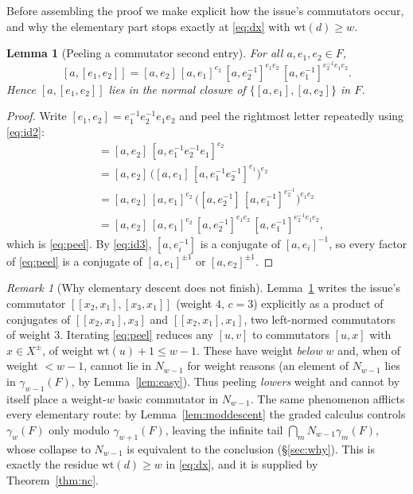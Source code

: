\documentclass{amsart}
\newtheorem{lemma}{Lemma}
\theoremstyle{definition}
\theoremstyle{remark}
\newtheorem{remark}{Remark}
\begin{document}
Before assembling the proof we make explicit how the issue's commutators occur,
and why the elementary part stops exactly at \eqref{eq:dx} with $\mathrm{wt}(d)\ge
w$.

\begin{lemma}[Peeling a commutator second entry]\label{lem:peel}
For all $a,e_1,e_2\in F$,
\begin{equation}\label{eq:peel}
[a,[e_1,e_2]]=[a,e_2]\,[a,e_1]^{e_2}\,[a,e_2^{-1}]^{e_1e_2}\,[a,e_1^{-1}]^{e_2^{-1}e_1e_2}.
\end{equation}
Hence $[a,[e_1,e_2]]$ lies in the normal closure of $\{[a,e_1],[a,e_2]\}$ in $F$.
\end{lemma}
\begin{proof}
Write $[e_1,e_2]=e_1^{-1}e_2^{-1}e_1e_2$ and peel the rightmost letter repeatedly
using \eqref{eq:id2}:
\begin{align*}
[a,e_1^{-1}e_2^{-1}e_1e_2]
&=[a,e_2]\,[a,e_1^{-1}e_2^{-1}e_1]^{e_2}\\
&=[a,e_2]\,\big([a,e_1]\,[a,e_1^{-1}e_2^{-1}]^{e_1}\big)^{e_2}\\
&=[a,e_2]\,[a,e_1]^{e_2}\,\big([a,e_2^{-1}]\,[a,e_1^{-1}]^{e_2^{-1}}\big)^{e_1e_2}\\
&=[a,e_2]\,[a,e_1]^{e_2}\,[a,e_2^{-1}]^{e_1e_2}\,[a,e_1^{-1}]^{e_2^{-1}e_1e_2},
\end{align*}
which is \eqref{eq:peel}. By \eqref{eq:id3}, $[a,e_i^{-1}]$ is a conjugate of
$[a,e_i]^{-1}$, so every factor of \eqref{eq:peel} is a conjugate of
$[a,e_1]^{\pm1}$ or $[a,e_2]^{\pm1}$.
\end{proof}

\begin{remark}[Why elementary descent does not finish]\label{rem:peel}
Lemma~\ref{lem:peel} writes the issue's commutator $[[x_2,x_1],[x_3,x_1]]$ (weight
$4$, $c=3$) explicitly as a product of conjugates of $[[x_2,x_1],x_3]$ and
$[[x_2,x_1],x_1]$, two left-normed commutators of weight $3$. Iterating
\eqref{eq:peel} reduces any $[u,v]$ to commutators $[u,x]$ with $x\in X^{\pm}$, of
weight $\mathrm{wt}(u)+1\le w-1$. These have weight \emph{below} $w$ and, when of
weight $<w-1$, cannot lie in $N_{w-1}$ for weight reasons (an element of $N_{w-1}$
lies in $\gamma_{w-1}(F)$, by Lemma~\ref{lem:easy}). Thus peeling \emph{lowers}
weight and cannot by itself place a weight-$w$ basic commutator in $N_{w-1}$. The
same phenomenon afflicts every elementary route: by Lemma~\ref{lem:moddescent} the
graded calculus controls $\gamma_w(F)$ only modulo $\gamma_{w+1}(F)$, leaving the
infinite tail $\bigcap_m N_{w-1}\gamma_m(F)$, whose collapse to $N_{w-1}$ is
equivalent to the conclusion (\S\ref{sec:why}). This is exactly the residue
$\mathrm{wt}(d)\ge w$ in \eqref{eq:dx}, and it is supplied by Theorem~\ref{thm:nc}.
\end{remark}
\end{document}
